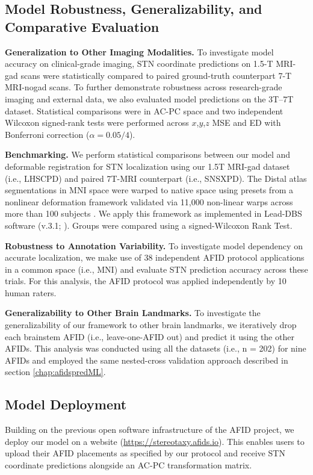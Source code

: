 \subsection{Model Robustness, Generalizability, and Comparative Evaluation}

\textbf{Generalization to Other Imaging Modalities.} To investigate model accuracy on clinical-grade imaging, STN coordinate predictions on 1.5-T MRI-gad scans were statistically compared to paired ground-truth counterpart 7-T MRI-nogad scans. To further demonstrate robustness across research-grade imaging and external data, we also evaluated model predictions on the 3T–7T dataset. Statistical comparisons were in AC-PC space and two independent Wilcoxon signed-rank tests were performed across $x$,$y$,$z$ MSE and ED with Bonferroni correction ($\alpha = 0.05 / 4$).

\textbf{Benchmarking.} We perform statistical comparisons between our model and deformable registration for STN localization using our 1.5T MRI-gad dataset (i.e., LHSCPD) and paired 7T-MRI counterpart (i.e., SNSXPD). The Distal atlas segmentations in MNI space \cite{Chakravarty2006-ln, Ewert2018-bn} were warped to native space using presets from a nonlinear deformation framework validated via 11,000 non-linear warps across more than 100 subjects \cite{Ewert2019-cc}. We apply this framework as implemented in Lead-DBS software (v.3.1; \cite{Neudorfer2023-wd}). Groups were compared using a signed-Wilcoxon Rank Test.

\textbf{Robustness to Annotation Variability.} To investigate model dependency on accurate localization, we make use of 38 independent AFID protocol applications in a common space (i.e., MNI) and evaluate STN prediction accuracy across these trials. For this analysis, the AFID protocol was applied independently by 10 human raters. 

\textbf{Generalizability to Other Brain Landmarks.} To investigate the generalizability of our framework to other brain landmarks, we iteratively drop each brainstem AFID (i.e., leave-one-AFID out) and predict it using the other AFIDs. This analysis was conducted using all the datasets (i.e., n = 202) for nine AFIDs and employed the same nested-cross validation approach described in section \ref{chap:afidspredML}.

\subsection{Model Deployment}
Building on the previous open software infrastructure of the AFID project, we deploy our model on a website (\url{https://stereotaxy.afids.io}). This enables users to upload their AFID placements as specified by our protocol and receive STN coordinate predictions alongside an AC-PC transformation matrix.

